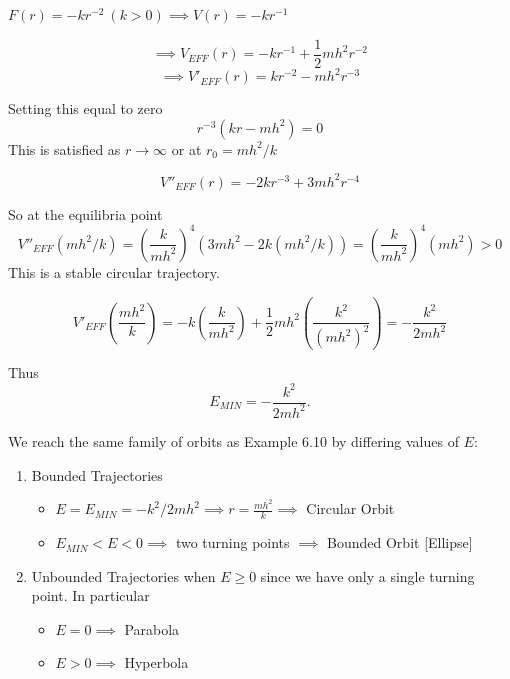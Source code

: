 \documentclass[10pt]{scrartcl}
\begin{document}
\begin{example}
	$F(r) = -kr^{-2} ~(k > 0) \implies V(r) = -kr^{-1}$
	
	 \[\implies V_{EFF}(r) = -kr^{-1} + \frac{1}{2}mh^2r^{-2}\] 
	 \[\implies V'_{EFF}(r) = kr^{-2} - mh^2r^{-3}\]
	 
	 Setting this equal to zero 
	 \[r^{-3}(kr -mh^2) = 0\]
	 This is satisfied as $r \to \infty$ or at $r_0 = mh^2/k$
	 
	 \[V''_{EFF}(r) = -2kr^{-3} + 3mh^2r^{-4}\]
	 
	 So at the equilibria point
	 \[V''_{EFF}(mh^2/k) = \left(\frac{k}{mh^2}\right)^4(3mh^2 - 2k(mh^2/k)) = \left(\frac{k}{mh^2}\right)^4(mh^2)  > 0\]
	 This is a stable circular trajectory.
	 
  \begin{center}
  \end{center}
  
  	 
\[ V'_{EFF}(\frac{mh^2}{k}) = -k\left(\frac{k}{mh^2}\right) + \frac{1}{2}mh^2\left(\frac{k^2}{(mh^2)^2}\right) = -\frac{k^2}{2mh^2}\] 

Thus \[E_{MIN} = -\frac{k^2}{2mh^2}.\]


We reach the same family of orbits as Example 6.10 by differing values of $E$:
\begin{enumerate}
\item Bounded Trajectories
\begin{itemize}
\item $E = E_{MIN} = -k^2/2mh^2 \implies r = \frac{mh^2}{k} \implies$ Circular Orbit
\item $E_{MIN} < E < 0 \implies $ two turning points $\implies$ Bounded Orbit [Ellipse]

\end{itemize}

\item Unbounded Trajectories when $E \geq 0$ since we have only a single turning point. In particular
\begin{itemize}
\item $E = 0 \implies $ Parabola
\item $E > 0 \implies $ Hyperbola
\end{itemize}

\end{enumerate}
\end{example}
\end{document}
